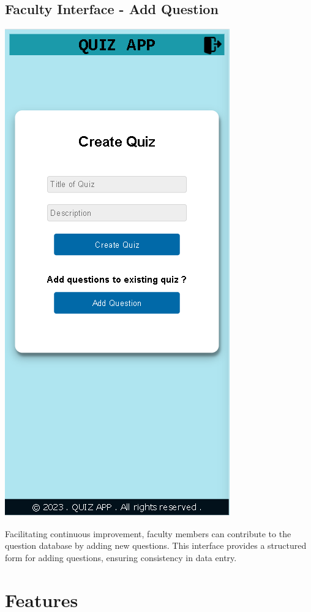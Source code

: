 \subsection{Faculty Interface - Add Question}
\begin{center}
    \includegraphics[scale=0.4]{project/images/ADD SUBJECT.png}
\end{center}

Facilitating continuous improvement, faculty members can contribute to the question database by adding new questions. This interface provides a structured form for adding questions, ensuring consistency in data entry.

\section{Features}

